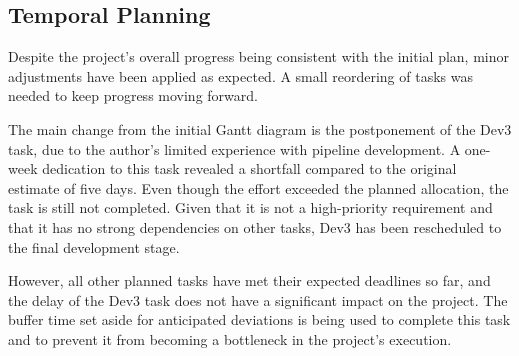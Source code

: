 \subsection{Temporal Planning}

Despite the project's overall progress being consistent with the initial plan, minor adjustments have been applied as expected. A small reordering of tasks was needed to keep progress moving forward.

The main change from the initial Gantt diagram is the postponement of the Dev3 task, due to the author's limited experience with pipeline development. A one-week dedication to this task revealed a shortfall compared to the original estimate of five days. Even though the effort exceeded the planned allocation, the task is still not completed. Given that it is not a high-priority requirement and that it has no strong dependencies on other tasks, Dev3 has been rescheduled to the final development stage. 

However, all other planned tasks have met their expected deadlines so far, and the delay of the Dev3 task does not have a significant impact on the project. The buffer time set aside for anticipated deviations is being used to complete this task and to prevent it from becoming a bottleneck in the project's execution.
